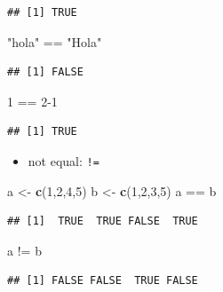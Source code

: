\documentclass[]{article}
\def\tightlist{}
\newenvironment{Shaded}{\begin{snugshade}}{\end{snugshade}}
\newcommand{\KeywordTok}[1]{\textcolor[rgb]{0.13,0.29,0.53}{\textbf{{#1}}}}
\newcommand{\DecValTok}[1]{\textcolor[rgb]{0.00,0.00,0.81}{{#1}}}
\newcommand{\StringTok}[1]{\textcolor[rgb]{0.31,0.60,0.02}{{#1}}}
\newcommand{\NormalTok}[1]{{#1}}
\numberwithin{equation}{section}
\begin{document}
\begin{verbatim}
## [1] TRUE
\end{verbatim}

\begin{Shaded}
\begin{Highlighting}[]
  \StringTok{"hola"} \NormalTok{==}\StringTok{ "Hola"}
\end{Highlighting}
\end{Shaded}

\begin{verbatim}
## [1] FALSE
\end{verbatim}

\begin{Shaded}
\begin{Highlighting}[]
   \DecValTok{1} \NormalTok{==}\StringTok{ }\DecValTok{2-1}
\end{Highlighting}
\end{Shaded}

\begin{verbatim}
## [1] TRUE
\end{verbatim}

\begin{itemize}
\tightlist
\item
  not equal: \texttt{!=}
\end{itemize}

\begin{Shaded}
\begin{Highlighting}[]
    \NormalTok{a <-}\StringTok{ }\KeywordTok{c}\NormalTok{(}\DecValTok{1}\NormalTok{,}\DecValTok{2}\NormalTok{,}\DecValTok{4}\NormalTok{,}\DecValTok{5}\NormalTok{)}
    \NormalTok{b <-}\StringTok{ }\KeywordTok{c}\NormalTok{(}\DecValTok{1}\NormalTok{,}\DecValTok{2}\NormalTok{,}\DecValTok{3}\NormalTok{,}\DecValTok{5}\NormalTok{) }
    \NormalTok{a ==}\StringTok{ }\NormalTok{b}
\end{Highlighting}
\end{Shaded}

\begin{verbatim}
## [1]  TRUE  TRUE FALSE  TRUE
\end{verbatim}

\begin{Shaded}
\begin{Highlighting}[]
    \NormalTok{a !=}\StringTok{ }\NormalTok{b}
\end{Highlighting}
\end{Shaded}

\begin{verbatim}
## [1] FALSE FALSE  TRUE FALSE
\end{verbatim}
\end{document}
